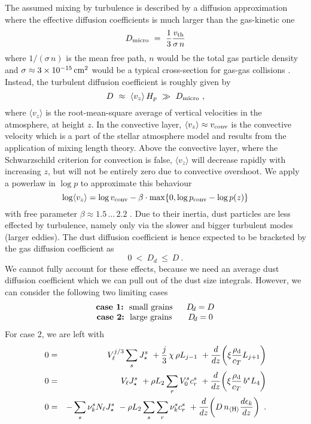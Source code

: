 \documentclass[11pt]{article}
\def\nH{n_{\langle\rm H\rangle}}
\def\Vl{V_{\ell}}
\def\Nl{N_{\ell}}
\def\rhod{\rho_{\rm d}}
\def\ek{\epsilon_k}
\def\Dd{D_{\!d}}
\begin{document}
The assumed mixing by turbulence is described by a diffusion
approximation where the effective diffusion coefficients is much
larger than the gas-kinetic one 
\begin{equation}
  D_{\rm micro} ~=~ \frac{1}{3}\frac{v_{\rm th}}{\sigma\,n}
\end{equation}
where $1/(\sigma\,n)$ is the mean free path, $n$ would be the total
gas particle density and $\sigma\approx 3\times 10^{-15}\rm\,cm^2$
would be a typical cross-section for gas-gas collisions
\citep{Woitke2003}.  Instead, the turbulent
diffusion coefficient is roughly given by
\begin{equation}
  D ~\approx~ \langle v_z\rangle\,H_p ~\gg~  D_{\rm micro} \ ,
\end{equation} 
where $\langle v_z\rangle$ is the root-mean-square average of vertical
velocities in the atmosphere, at height $z$. In the convective layer,
$\langle v_z\rangle\approx v_{\rm conv}$ is the convective velocity
which is a part of the stellar atmosphere model and results from the
application of mixing length theory.  Above the convective layer,
where the Schwarzschild criterion for convection is false, $\langle
v_z\rangle$ will decrease rapidly with increasing $z$, but will not be
entirely zero due to convective overshoot. We apply a powerlaw
in $\log p$ to approximate this behaviour
\begin{equation}
  \log \langle v_z\rangle = \log v_{\rm conv} 
                          - \beta\cdot\max\{0,\log p_{\rm conv}-\log p(z)\}
\end{equation}
with free parameter $\beta\approx 1.5\,...\,2.2$ \citep{Ludwig2002,Lee2015}.
Due to their inertia, dust particles are less effected by turbulence,
namely only via the slower and bigger turbulent modes (larger eddies). The dust
diffusion coefficient is hence expected to be bracketed by the gas
diffusion coefficient as
\begin{equation}
  0 ~<~ \Dd ~\leq~ D \ .
\end{equation}
We cannot fully account for these effects, because we need an average
dust diffusion coefficient which we can pull out of the dust size
integrals. However, we can consider the following two limiting cases
\begin{equation}
  \begin{array}{cc}
  \mbox{{\bf case 1:}\ \ small grains\ \ } & \Dd=D\\
  \mbox{{\bf case 2:}\ \ large grains\ \ } & \Dd=0
  \end{array}
\end{equation}
For case 2, we are left with
\begin{eqnarray}
 0 &=& \Vl^{j/3} \sum\limits_s J_\star^s
    ~+ \frac{j}{3}\,\chi\,\rho L_{j-1}
    ~+ \frac{d}{dz}\!\left(\xi\frac{\rhod}{c_T}L_{j+1}\right) \\
 0 &=& \Vl J_\star^s 
    ~+ \rho L_2 \sum\limits_r V_0^s c_r^s  
    ~+ \frac{d}{dz}\!\left(\xi\frac{\rhod}{c_T}\,b^s L_4\right)
   \label{eq1}\\
 0 &=& -\sum\limits_s \nu_k^s \Nl J_\star^s 
    ~- \rho L_2 \sum\limits_s\sum\limits_r \nu_k^s c_r^s 
    ~+ \frac{d}{dz}\!\left(D\,\nH\frac{d\ek}{dz}\right)  \ .
   \label{eq2}
\end{eqnarray}
\end{document}
